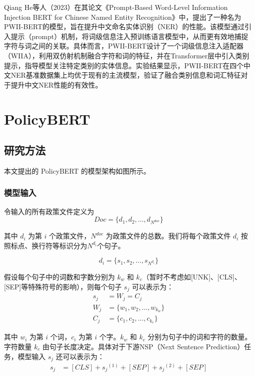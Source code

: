 \documentclass[12pt, a4paper]{ctexart}
\begin{document}
Qiang He等人（2023）在其论文《Prompt-Based Word-Level Information Injection BERT for Chinese Named Entity Recognition》中，提出了一种名为PWII-BERT的模型，旨在提升中文命名实体识别（NER）的性能\cite{He2023PromptBasedWI}。该模型通过引入提示（prompt）机制，将词级信息注入预训练语言模型中，从而更有效地捕捉字符与词之间的关联。具体而言，PWII-BERT设计了一个词级信息注入适配器（WIIA），利用双仿射机制融合字符和词的特征，并在Transformer层中引入类别提示，指导模型关注特定类别的实体信息。实验结果显示，PWII-BERT在四个中文NER基准数据集上均优于现有的主流模型，验证了融合类别信息和词汇特征对于提升中文NER性能的有效性。 



\section{PolicyBERT}
\subsection{研究方法}

本文提出的 PolicyBERT 的模型架构如图所示。

\subsubsection{模型输入}
令输入的所有政策文件定义为 
\begin{equation}
    Doc = \{d_1, d_2, \dots, d_{N^{doc}}\} 
\end{equation}

其中 $d_i$ 为第 $i$ 个政策文件，${N^{doc}}$ 为政策文件的总数。我们将每个政策文件 $d_i$ 按照标点、换行符等标识分为$N^{d_i}$个句子。 

\begin{equation}
   d_i = \{s_1, s_2, \dots, s_{N^{d_i}}\} 
\end{equation}

假设每个句子中的词数和字数分别为 $k_w$ 和 $k_c$（暂时不考虑如[UNK]、[CLS]、[SEP]等特殊符号的影响），则每个句子 $s_j$ 可以表示为：
\begin{equation}
    \begin{split}
        s_j &= W_j = C_j \\
        W_j &= \{w_1, w_2, \dots, w_{k_w}\} \\
        C_j &= \{c_1, c_2, \dots, c_{k_c}\}
    \end{split}
\end{equation}

其中 $w_i$ 为第 $i$ 个词，$c_i$ 为第 $i$ 个字。$k_w$ 和 $k_c$ 分别为句子中的词和字符的数量。字符数量 $k_c$ 由句子长度决定。具体对于下游NSP（Next Sentence Prediction）任务，模型输入 $s_j$ 还可以表示为：
\begin{equation}
    \begin{split}
        s_j &= [CLS] + {s_j}^{(1)} + [SEP] + {s_j}^{(2)} + [SEP] \\
    \end{split}
\end{equation} 
\end{document}
